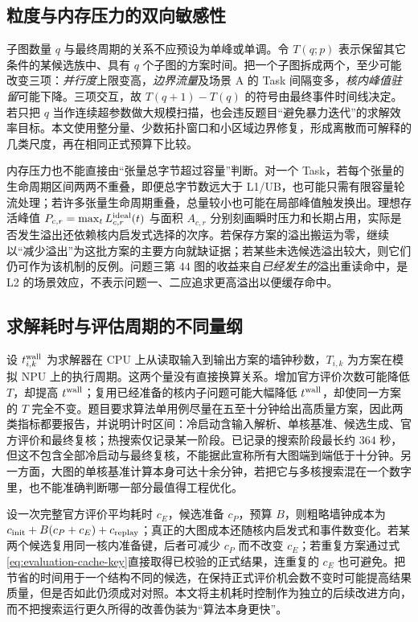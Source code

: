 \subsection{粒度与内存压力的双向敏感性}
子图数量 $q$ 与最终周期的关系不应预设为单峰或单调。令 $T(q;p)$ 表示保留其它条件的某候选族中、具有 $q$ 个子图的方案时间。把一个子图拆成两个，至少可能改变三项：\emph{并行度}上限变高，\emph{边界流量}及场景 A 的 Task 间隔变多，\emph{核内峰值驻留}可能下降。三项交互，故 $T(q+1)-T(q)$ 的符号由最终事件时间线决定。若只把 $q$ 当作连续超参数做大规模扫描，也会违反题目“避免暴力迭代”的求解效率目标。本文使用整分量、少数拓扑窗口和小区域边界修复，形成离散而可解释的几类尺度，再在相同正式预算下比较。

内存压力也不能直接由“张量总字节超过容量”判断。对一个 Task，若每个张量的生命周期区间两两不重叠，即便总字节数远大于 L1/UB，也可能只需有限容量轮流处理；若许多张量生命周期重叠，总量较小也可能在局部峰值触发换出。理想存活峰值 $P_{c,r}=\max_tL^{\rm ideal}_{c,r}(t)$ 与面积 $A_{c,r}$ 分别刻画瞬时压力和长期占用，实际是否发生溢出还依赖核内启发式选择的次序。若保存方案的溢出搬运为零，继续以“减少溢出”为这批方案的主要方向就缺证据；若某些未选候选溢出较大，则它们仍可作为该机制的反例。问题三第 $44$ 图的收益来自\emph{已经发生的}溢出重读命中，是 L2 的场景效应，不表示问题一、二应追求更高溢出以便缓存命中。

\subsection{求解耗时与评估周期的不同量纲}
设 $t^{\rm wall}_{i,k}$ 为求解器在 CPU 上从读取输入到输出方案的墙钟秒数，$T_{i,k}$ 为方案在模拟 NPU 上的执行周期。这两个量没有直接换算关系。增加官方评价次数可能降低 $T$，却提高 $t^{\rm wall}$；复用已经准备的核内子问题可能大幅降低 $t^{\rm wall}$，却使同一方案的 $T$ 完全不变。题目要求算法单用例尽量在五至十分钟给出高质量方案，因此两类指标都要报告，并说明计时区间：冷启动含输入解析、单核基准、候选生成、官方评价和最终复核；热搜索仅记录某一阶段。已记录的搜索阶段最长约 $364$ 秒，但这不包含全部冷启动与最终复核，不能据此宣称所有大图端到端低于十分钟。另一方面，大图的单核基准计算本身可达十余分钟，若把它与多核搜索混在一个数字里，也不能准确判断哪一部分最值得工程优化。

设一次完整官方评价平均耗时 $c_E$，候选准备 $c_P$，预算 $B$，则粗略墙钟成本为 $c_{\rm init}+B(c_P+c_E)+c_{\rm replay}$；真正的大图成本还随核内启发式和事件数变化。若某两个候选复用同一核内准备键，后者可减少 $c_P$ 而不改变 $c_E$；若重复方案通过式\eqref{eq:evaluation-cache-key}直接取得已校验的正式结果，连重复的 $c_E$ 也可避免。把节省的时间用于一个结构不同的候选，在保持正式评价机会数不变时可能提高结果质量，但是否如此仍须成对对照。本文将主机耗时控制作为独立的后续改进方向，而不把搜索运行更久所得的改善伪装为“算法本身更快”。

